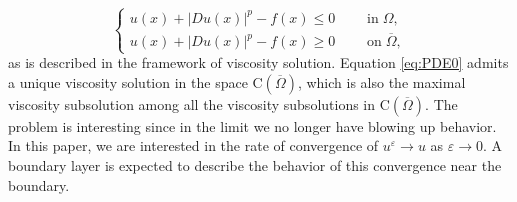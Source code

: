 \documentclass[11pt,reqno]{amsart}
\numberwithin{figure}{section}
\theoremstyle{plain}
\theoremstyle{remark}
\numberwithin{equation}{section}
\newcommand{\rmC}{\mathrm{C}}
\begin{document}
\begin{equation}\label{eq:PDE0}
    \begin{cases}
       u(x) + |Du(x)|^p - f(x) \leq 0\;\qquad\text{in}\;\Omega,\\
       u(x) + |Du(x)|^p - f(x) \geq 0\;\qquad\text{on}\;\overline{\Omega},
    \end{cases} \tag{PDE$_0$}
\end{equation}
as is described in the framework of viscosity solution.
Equation \eqref{eq:PDE0} admits a unique viscosity solution in the space $\rmC(\overline{\Omega})$, which is also the maximal viscosity subsolution among all the viscosity subsolutions in $\rmC(\overline{\Omega})$. The problem is interesting since in the limit we no longer have blowing up behavior. In this paper, we are interested in the rate of convergence of $u^\varepsilon \to u$ as $\varepsilon\to 0$. A boundary layer is expected to describe the behavior of this convergence near the boundary.
\end{document}
